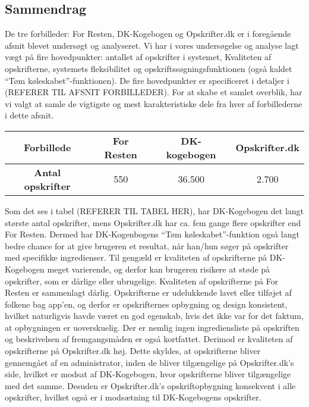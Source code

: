 \subsection{Sammendrag}
\label{sec:forbilleder:sammendrag}
De tre forbilleder: For Resten, DK-Kogebogen og Opskrifter.dk er i foregående afsnit blevet undersøgt og analyseret. Vi har i vores undersøgelse og analyse lagt vægt på fire hovedpunkter: antallet af opskrifter i systemet, Kvaliteten af opskrifterne, systemets fleksibilitet og opskriftssøgningsfunktionen (også kaldet ``Tøm køleskabet''-funktionen). De fire hovedpunkter er specificeret i detaljer i (REFERER TIL AFSNIT FORBILLEDER). For at skabe et samlet overblik, har vi valgt at samle de vigtigste og mest karakteristiske dele fra hver af forbillederne i dette afsnit.

\begin{table}
\centering
\begin{tabular}{| c | c | c | c |}
\hline
\textbf{Forbillede} & For Resten & DK-kogebogen & Opskrifter.dk \\ \hline
\textbf{Antal opskrifter} & 550 & 36.500 & 2.700 \\ \hline
\end{tabular}
\label{table:forbilledeantal}
\end{table}

Som det ses i tabel (REFERER TIL TABEL HER), har DK-Kogebogen det langt største antal opskrifter, mens Opskrifter.dk har ca. fem gange flere opskrifter end For Resten. Dermed har DK-Kogenbogens ``Tøm køleskabet''-funktion også langt bedre chance for at give brugeren et resultat, når han/hun søger på opskrifter med specifikke ingredienser. Til gengæld er kvaliteten af opskrifterne på DK-Kogebogen meget varierende, og derfor kan brugeren risikere at støde på opskrifter, som er dårlige eller ubrugelige. Kvaliteten af opskrifterne på For Resten er sammenlagt dårlig. Opskrifterne er udelukkende lavet eller tilføjet af folkene bag app’en, og derfor er opskrifternes opbygning og design konsistent, hvilket naturligvis havde været en god egenskab, hvis det ikke var for det faktum, at opbygningen er uoverskuelig. Der er nemlig ingen ingrediensliste på opskriften og beskrivelsen af fremgangsmåden er også kortfattet. Derimod er kvaliteten af opskrifterne på Opskrifter.dk høj. Dette skyldes, at opskrifterne bliver gennemgået af en administrator, inden de bliver tilgængelige på Opskrifter.dk’s side, hvilket er modsat af DK-Kogebogen, hvor opskrifterne bliver tilgængelige med det samme. Desuden er Opskrifter.dk’s opskriftopbygning konsekvent i alle opskrifter, hvilket også er i modsætning til DK-Kogebogens opskrifter.

